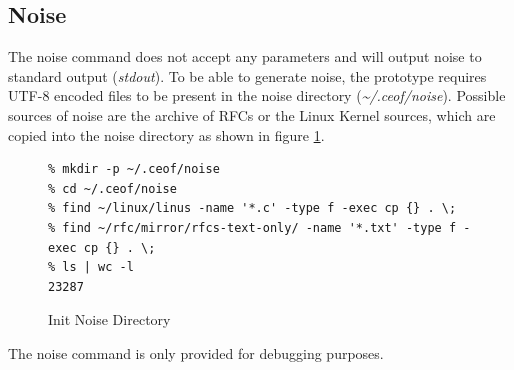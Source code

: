 \subsection{Noise}
The noise command does not accept any parameters and will output noise to
standard output (\textit{stdout}).
To be able to generate noise, the prototype requires UTF-8 encoded
files to be present in the noise directory (\textit{\textasciitilde{}/.ceof/noise}).
Possible sources of noise are the archive of RFCs or
the Linux Kernel sources, which are copied
into the noise directory as shown in figure \ref{initnoise}.
\begin{figure}[htbp]
\caption{Init Noise Directory}
\label{initnoise}
\begin{verbatim}
% mkdir -p ~/.ceof/noise
% cd ~/.ceof/noise 
% find ~/linux/linus -name '*.c' -type f -exec cp {} . \;
% find ~/rfc/mirror/rfcs-text-only/ -name '*.txt' -type f -exec cp {} . \;
% ls | wc -l
23287
\end{verbatim}
\end{figure}
The noise command is only provided for debugging purposes.
